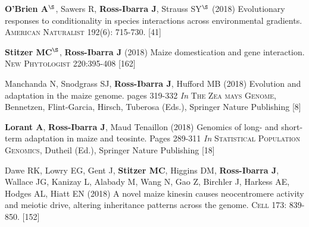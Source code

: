 \documentclass[letterpaper,10pt]{article}
\begin{document}
\begin{etaremune}
\item \textbf{O'Brien A}$^\S$, Sawers R, \textbf{Ross-Ibarra J}, Strauss  SY$^\S$ (2018) Evolutionary responses to conditionality in species interactions across environmental gradients. \textsc{American Naturalist} 192(6): 715-730.
{} [41]\\

\item \textbf{Stitzer MC}$^\S$, \textbf{Ross-Ibarra J} (2018) Maize domestication and gene interaction. \textsc{New Phytologist} 220:395-408
{} [162]\\

\item Manchanda N, Snodgrass SJ, \textbf{Ross-Ibarra J}, Hufford MB (2018) Evolution and adaptation in the maize genome. pages 319-332 \textit{In} \textsc{The Zea mays Genome}, Bennetzen, Flint-Garcia, Hirsch, Tuberosa (Eds.), Springer Nature Publishing 
{} [8]\\

\item \textbf{Lorant A}, \textbf{Ross-Ibarra J}, Maud Tenaillon (2018) Genomics of long- and short- term adaptation in maize and teosinte. Pages 289-311 \textit{In} \textsc{Statistical Population Genomics},  Dutheil (Ed.), Springer Nature Publishing 
{} [18]\\

\item Dawe RK, Lowry EG, Gent J, \textbf{Stitzer MC}, Higgins DM, \textbf{Ross-Ibarra J}, Wallace JG, Kanizay L, Alabady M, Wang N, Gao Z, Birchler J, Harkess AE, Hodges AL, Hiatt EN (2018) A novel maize kinesin causes neocentromere activity and meiotic drive, altering inheritance patterns across the genome. \textsc{Cell} 173: 839-850.
{} [152]\\


\end{etaremune}
\end{document}
